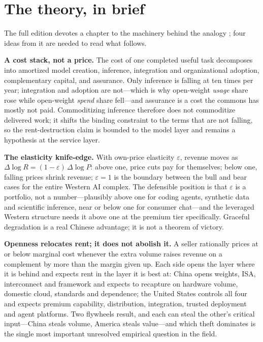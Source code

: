 \section{The theory, in brief}
\label{c:theory}

The full edition devotes a chapter to the machinery behind the analogy ; four ideas from it are needed to read what follows.

\textbf{A cost stack, not a price.} The cost of one completed useful task decomposes into amortized model creation, inference, integration and organizational adoption, complementary capital, and assurance. Only inference is falling at ten times per year; integration and adoption are not---which is why open-weight \emph{usage} share rose while open-weight \emph{spend} share fell---and assurance is a cost the commons has mostly not paid. Commoditizing inference therefore does not commoditize delivered work; it shifts the binding constraint to the terms that are not falling, so the rent-destruction claim is bounded to the model layer and remains a hypothesis at the service layer.

\textbf{The elasticity knife-edge.} With own-price elasticity $\varepsilon$, revenue moves as $\Delta\log R=(1-\varepsilon)\,\Delta\log P$: above one, price cuts pay for themselves; below one, falling prices shrink revenue; $\varepsilon=1$ is the boundary between the bull and bear cases for the entire Western AI complex. The defensible position is that $\varepsilon$ is a portfolio, not a number---plausibly above one for coding agents, synthetic data and scientific inference, near or below one for consumer chat---and the leveraged Western structure needs it above one at the premium tier specifically. Graceful degradation is a real Chinese advantage; it is not a theorem of victory.

\textbf{Openness relocates rent; it does not abolish it.} A seller rationally prices at or below marginal cost whenever the extra volume raises revenue on a complement by more than the margin given up. Each side opens the layer where it is behind and expects rent in the layer it is best at: China opens weights, ISA, interconnect and framework and expects to recapture on hardware volume, domestic cloud, standards and dependence; the United States controls all four and expects premium capability, distribution, integration, trusted deployment and agent platforms. Two flywheels result, and each can steal the other's critical input---China steals volume, America steals value---and which theft dominates is the single most important unresolved empirical question in the field.

